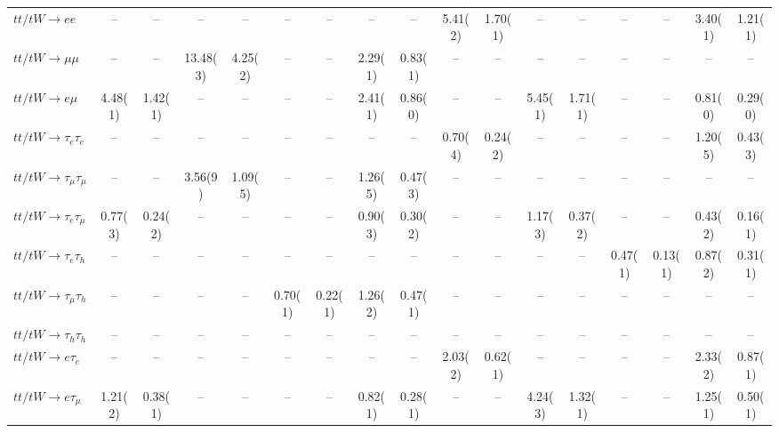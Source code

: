 \begin{sidewaystable}[p]
\begin{tabular}{|l|cc|cc|cc|cc|cc|cc|cc|cc|}
    $tt/tW \to ee$                     &    --    &    --    &    --    &    --    &    --    &    --    &    --    &    --    &  5.41(2) &  1.70(1) &    --    &    --    &    --    &    --    &  3.40(1) &  1.21(1) \\ 
    $tt/tW \to \mu\mu$                 &    --    &    --    & 13.48(3) &  4.25(2) &    --    &    --    &  2.29(1) &  0.83(1) &    --    &    --    &    --    &    --    &    --    &    --    &    --    &    --    \\ 
    $tt/tW \to e\mu$                   &  4.48(1) &  1.42(1) &    --    &    --    &    --    &    --    &  2.41(1) &  0.86(0) &    --    &    --    &  5.45(1) &  1.71(1) &    --    &    --    &  0.81(0) &  0.29(0) \\ 
    $tt/tW \to \tau_{e}\tau_{e}$       &    --    &    --    &    --    &    --    &    --    &    --    &    --    &    --    &  0.70(4) &  0.24(2) &    --    &    --    &    --    &    --    &  1.20(5) &  0.43(3) \\ 
    $tt/tW \to \tau_{\mu}\tau_{\mu}$   &    --    &    --    &  3.56(9) &  1.09(5) &    --    &    --    &  1.26(5) &  0.47(3) &    --    &    --    &    --    &    --    &    --    &    --    &    --    &    --    \\ 
    $tt/tW \to \tau_{e}\tau_{\mu}$     &  0.77(3) &  0.24(2) &    --    &    --    &    --    &    --    &  0.90(3) &  0.30(2) &    --    &    --    &  1.17(3) &  0.37(2) &    --    &    --    &  0.43(2) &  0.16(1) \\ 
    $tt/tW \to \tau_{e}\tau_{h}$       &    --    &    --    &    --    &    --    &    --    &    --    &    --    &    --    &    --    &    --    &    --    &    --    &  0.47(1) &  0.13(1) &  0.87(2) &  0.31(1) \\ 
    $tt/tW \to \tau_{\mu}\tau_{h}$     &    --    &    --    &    --    &    --    &  0.70(1) &  0.22(1) &  1.26(2) &  0.47(1) &    --    &    --    &    --    &    --    &    --    &    --    &    --    &    --    \\ 
    $tt/tW \to \tau_{h}\tau_{h}$       &    --    &    --    &    --    &    --    &    --    &    --    &    --    &    --    &    --    &    --    &    --    &    --    &    --    &    --    &    --    &    --    \\ 
    $tt/tW \to e\tau_{e}$              &    --    &    --    &    --    &    --    &    --    &    --    &    --    &    --    &  2.03(2) &  0.62(1) &    --    &    --    &    --    &    --    &  2.33(2) &  0.87(1) \\ 
    $tt/tW \to e\tau_{\mu}$            &  1.21(2) &  0.38(1) &    --    &    --    &    --    &    --    &  0.82(1) &  0.28(1) &    --    &    --    &  4.24(3) &  1.32(1) &    --    &    --    &  1.25(1) &  0.50(1) \\ 

\end{tabular}
\end{sidewaystable}
